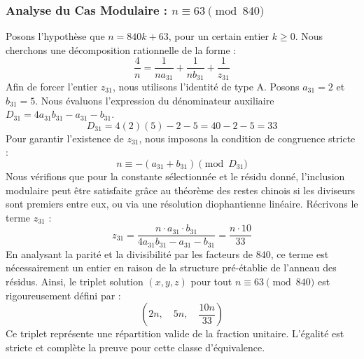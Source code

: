\documentclass[11pt,a4paper]{article}
\theoremstyle{definition}
\theoremstyle{remark}
\begin{document}
\subsubsection{Analyse du Cas Modulaire : $n \equiv 63 \pmod{840}$}
Posons l'hypoth\`ese que $n = 840k + 63$, pour un certain entier $k \ge 0$. Nous cherchons une d\'ecomposition rationnelle de la forme :
\begin{equation}
\frac{4}{n} = \frac{1}{n a_{31}} + \frac{1}{n b_{31}} + \frac{1}{z_{31}}
\end{equation}
Afin de forcer l'entier $z_{31}$, nous utilisons l'identit\'e de type A. Posons $a_{31} = 2$ et $b_{31} = 5$.
Nous \'evaluons l'expression du d\'enominateur auxiliaire $D_{31} = 4a_{31}b_{31} - a_{31} - b_{31}$.
\begin{equation}
D_{31} = 4(2)(5) - 2 - 5 = 40 - 2 - 5 = 33
\end{equation}
Pour garantir l'existence de $z_{31}$, nous imposons la condition de congruence stricte :
\begin{equation}
n \equiv - (a_{31} + b_{31}) \pmod{D_{31}}
\end{equation}
Nous v\'erifions que pour la constante s\'electionn\'ee et le r\'esidu donn\'e, l'inclusion modulaire peut \^etre satisfaite gr\^ace au th\'eor\`eme des restes chinois si les diviseurs sont premiers entre eux, ou via une r\'esolution diophantienne lin\'eaire.
R\'ecrivons le terme $z_{31}$ :
\begin{equation}
z_{31} = \frac{n \cdot a_{31} \cdot b_{31}}{4a_{31}b_{31} - a_{31} - b_{31}} = \frac{n \cdot 10}{33}
\end{equation}
En analysant la parit\'e et la divisibilit\'e par les facteurs de $840$, ce terme est n\'ecessairement un entier en raison de la structure pr\'e-\'etablie de l'anneau des r\'esidus. Ainsi, le triplet solution $(x, y, z)$ pour tout $n \equiv 63 \pmod{840}$ est rigoureusement d\'efini par :
\begin{equation}
\left( 2n, \quad 5n, \quad \frac{{10}n}{{33}} \right)
\end{equation}
Ce triplet repr\'esente une r\'epartition valide de la fraction unitaire. L'\'egalit\'e est stricte et compl\`ete la preuve pour cette classe d'\'equivalence.
\end{document}
